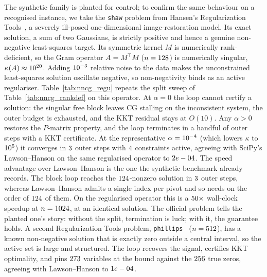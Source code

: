 The synthetic family is planted for control; to confirm
the same behaviour on a recognised instance, we take the \texttt{shaw} problem from Hansen's
Regularization Tools~\cite{hansen1994regutools,shaw1972}, a severely ill-posed one-dimensional
image-restoration model. Its exact solution, a sum of two Gaussians, is strictly positive and
hence a genuine non-negative least-squares target. Its symmetric kernel $M$ is numerically
rank-deficient, so the Gram operator $A = M^\top M$ ($n = \nncgReguN{}$) is numerically
singular, $\kappa(A) \approx 10^{20}{}$. Adding $\nncgReguNoise{}$ relative noise to the
data makes the unconstrained least-squares solution oscillate negative, so non-negativity
binds as an active regulariser. Table~\ref{tab:nncg_regu} repeats the split sweep of
Table~\ref{tab:nncg_rankdef} on this operator. At $\alpha = 0$ the loop cannot certify a
solution: the singular free block leaves CG stalling on the inconsistent system, the outer
budget is exhausted, and the KKT residual stays at $O(10)$. Any $\alpha > 0$ restores the
$P$-matrix property, and the loop terminates in a handful of outer steps with a KKT
certificate. At the representative $\alpha = 10^{-4}{}$ (which lowers $\kappa$ to
$10^{5}{}$) it converges in $3{}$ outer steps with $4{}$
constraints active, agreeing with SciPy's Lawson--Hanson on the same regularised operator to
$2e-04{}$. The speed advantage over Lawson--Hanson is the one the synthetic benchmark
already records. The block loop reaches the $124{}$-nonzero solution in
$3{}$ outer steps, whereas Lawson--Hanson admits a single index per pivot and so
needs on the order of $124{}$ of them. On the regularised operator this is a
$50{}\times$ wall-clock speedup at $n = 1024{}$, at an identical
solution. The official problem tells the planted one's story: without the split,
termination is luck; with it, the guarantee holds. A second Regularization Tools
problem, \texttt{phillips}~\cite{hansen1994regutools,phillips1962} ($n = 512{}$), has a
known non-negative solution that is exactly zero outside a central interval, so the active set
is large and structured. The loop recovers the signal, certifies KKT optimality, and pins
$273{}$ variables at the bound against the $256{}$ true zeros,
agreeing with Lawson--Hanson to $1e-04{}$.

\begin{table}[ht]
\centering
\footnotesize

\caption{The \texttt{shaw} ill-posed problem from Hansen's Regularization
Tools~\cite{hansen1994regutools} ($n = \nncgReguN{}$, $\nncgReguNoise{}$ relative data noise;
CG capped at $2000$ iterations per solve, $30$ outer steps). ``Active'' counts components
pinned at the bound. At $\alpha = 0$ the singular Gram operator
($\kappa \approx \nncgReguKappa{}$) leaves the loop uncertified; any $\alpha > 0$ terminates
with a KKT certificate, matching Lawson--Hanson on the regularised operator.}
\label{tab:nncg_regu}
\end{table}

